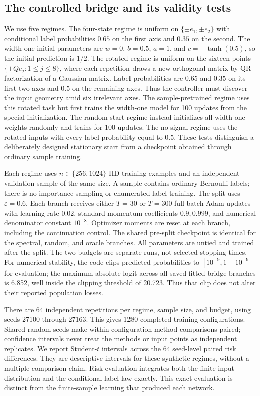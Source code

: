\subsection{The controlled bridge and its validity tests}

We use five regimes. The four-state regime is uniform on
$\{\pm e_1,\pm e_2\}$ with conditional label probabilities $0.65$ on the first
axis and $0.35$ on the second. The width-one initial parameters are
$w=0$, $b=0.5$, $a=1$, and $c=-\tanh(0.5)$, so the initial prediction is $1/2$.
The rotated regime is uniform on the sixteen points $\{\pm Qe_j:1\leq j\leq8\}$,
where each repetition draws a new orthogonal matrix by QR factorization of a
Gaussian matrix. Label probabilities are $0.65$ and $0.35$ on its first two
axes and $0.5$ on the remaining axes. Thus the controller must discover the
input geometry amid six irrelevant axes. The sample-pretrained regime uses
this rotated task but first trains the width-one model for 100 updates from
the special initialization. The random-start regime instead initializes all
width-one weights randomly and trains for 100 updates. The no-signal regime
uses the rotated inputs with every label probability equal to $0.5$.
These tests distinguish a deliberately designed stationary start from a
checkpoint obtained through ordinary sample training.

Each regime uses $n\in\{256,1024\}$ IID training examples and an independent
validation sample of the same size. A sample contains ordinary Bernoulli labels;
there is no importance sampling or enumerated-label training. The split uses
$\varepsilon=0.6$. Each branch receives either $T=30$ or $T=300$ full-batch Adam
updates with learning rate $0.02$, standard momentum coefficients $0.9,0.999$,
and numerical denominator constant $10^{-8}$. Optimizer moments are reset at
each branch, including the continuation control. The shared pre-split checkpoint
is identical for the spectral, random, and oracle branches. All parameters are
untied and trained after the split. The two budgets are separate runs, not
selected stopping times. For numerical stability, the code clips
predicted probabilities to $[10^{-9},1-10^{-9}]$ for evaluation; the
maximum absolute logit across all saved fitted bridge branches is 6.852,
well inside the clipping threshold of 20.723. Thus that clip does not
alter their reported population losses.

There are 64 independent repetitions per regime, sample size, and budget,
using seeds 27100 through 27163. This gives 1280 completed training configurations.
Shared random seeds make within-configuration method comparisons paired;
confidence intervals never treat the methods or input points as independent
replicates. We report Student-$t$ intervals across the 64 seed-level paired
risk differences. They are descriptive intervals for these synthetic regimes,
without a multiple-comparison claim. Risk evaluation integrates both the finite
input distribution and the conditional label law exactly. This exact evaluation
is distinct from the finite-sample learning that produced each network.


